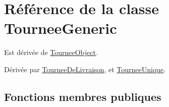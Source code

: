 \hypertarget{classTourneeGeneric}{}\section{Référence de la classe Tournee\+Generic}
\label{classTourneeGeneric}


Est dérivée de \hyperlink{classTourneeObject}{Tournee\+Object}.



Dérivée par \hyperlink{classTourneeDeLivraison}{Tournee\+De\+Livraison}, et \hyperlink{classTourneeUnique}{Tournee\+Unique}.

\subsection*{Fonctions membres publiques}
